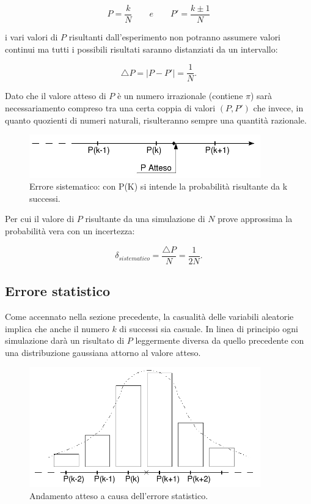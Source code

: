 \documentclass{article}
\begin{document}
	\begin{displaymath}
	P=\dfrac{k}{N}
	\qquad e \qquad
	P'=\dfrac{k\pm1}{N}
	\end{displaymath}

i vari valori di $P$ risultanti dall'esperimento non potranno assumere valori continui ma tutti i possibili risultati saranno distanziati da un intervallo:

	\begin{displaymath}
	\bigtriangleup P = \mid P-P' \mid = \dfrac{1}{N} .
	\end{displaymath}

Dato che il valore atteso di $P$ è un numero irrazionale (contiene $\pi$) sarà necessariamento compreso tra una certa coppia di valori $(P , P')$ che invece, in quanto quozienti di numeri naturali, risulteranno sempre una quantità razionale. 

	\begin{figure}[htbp]
	\centering
	\includegraphics[width=10cm,keepaspectratio]{disegno2.jpg}
	\caption{Errore sistematico: con P(K) si intende la probabilità risultante da k successi.}
	\end{figure}

Per cui il valore di $P$ risultante da una simulazione di $N$ prove approssima la probabilità vera con un incertezza:

	\begin{equation}
	\delta_{sistematico}=\dfrac{\bigtriangleup P}{N}=\dfrac{1}{2N}	.
	\end{equation}

\subsection{Errore statistico}

Come accennato nella sezione precedente, la casualità delle variabili aleatorie implica che anche il numero $k$ di successi sia casuale. In linea di principio ogni simulazione darà un risultato di $P$ leggermente diversa da quello precedente con una distribuzione gaussiana attorno al valore atteso.

\begin{figure}[htbp]
	\centering
	\includegraphics[width=10cm,keepaspectratio]{disegno3.jpg}
	\caption{Andamento atteso a causa dell'errore statistico.}
	\end{figure}
\end{document}
